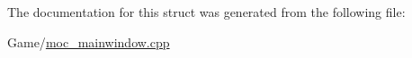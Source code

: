 The documentation for this struct was generated from the following file\-:\begin{DoxyCompactItemize}
\item 
Game/\hyperlink{moc__mainwindow_8cpp}{moc\-\_\-mainwindow.\-cpp}\end{DoxyCompactItemize}
